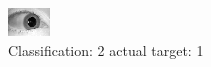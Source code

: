 \begin{figure}[h!]
\begin{center}
\includegraphics[width=0.60\columnwidth]{figures/ID1573_class_2_target_1.png}
\end{center}
\caption{ Classification: 2 actual target: 1}
\label{fig:ID1573_class_2_target_1}
\end{figure}
